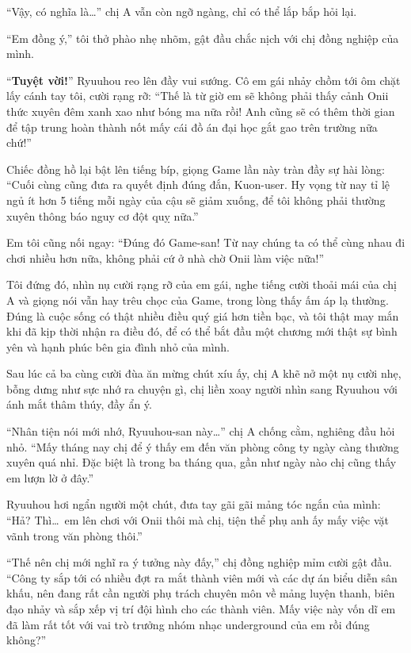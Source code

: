 \documentclass[../main.tex]{subfiles}
\begin{document}
``Vậy, có nghĩa là\dots'' chị A vẫn còn ngỡ ngàng, chỉ có thể lắp bắp hỏi lại.

``Em đồng ý,'' tôi thở phào nhẹ nhõm, gật đầu chắc nịch với chị đồng nghiệp của mình.

``\textbf{Tuyệt vời!}'' Ryuuhou reo lên đầy vui sướng. Cô em gái nhảy chồm tới ôm chặt lấy cánh tay tôi, cười rạng rỡ: ``Thế là từ giờ em sẽ không phải thấy cảnh Onii thức xuyên đêm xanh xao như bóng ma nữa rồi! Anh cũng sẽ có thêm thời gian để tập trung hoàn thành nốt mấy cái đồ án đại học gắt gao trên trường nữa chứ!''

Chiếc đồng hồ lại bật lên tiếng bíp, giọng Game lần này tràn đầy sự hài lòng: ``Cuối cùng cũng đưa ra quyết định đúng đắn, Kuon-user. Hy vọng từ nay tỉ lệ ngủ ít hơn 5 tiếng mỗi ngày của cậu sẽ giảm xuống, để tôi không phải thường xuyên thông báo nguy cơ đột quỵ nữa.''

Em tôi cũng nối ngay: ``Đúng đó Game-san! Từ nay chúng ta có thể cùng nhau đi chơi nhiều hơn nữa, không phải cứ ở nhà chờ Onii làm việc nữa!''

Tôi đứng đó, nhìn nụ cười rạng rỡ của em gái, nghe tiếng cười thoải mái của chị A và giọng nói vẫn hay trêu chọc của Game, trong lòng thấy ấm áp lạ thường. Đúng là cuộc sống có thật nhiều điều quý giá hơn tiền bạc, và tôi thật may mắn khi đã kịp thời nhận ra điều đó, để có thể bắt đầu một chương mới thật sự bình yên và hạnh phúc bên gia đình nhỏ của mình.

\ct

Sau lúc cả ba cùng cười đùa ăn mừng chút xíu ấy, chị A khẽ nở một nụ cười nhẹ, bỗng dưng như sực nhớ ra chuyện gì, chị liền xoay người nhìn sang Ryuuhou với ánh mắt thâm thúy, đầy ẩn ý.

``Nhân tiện nói mới nhớ, Ryuuhou-san này\dots'' chị A chống cằm, nghiêng đầu hỏi nhỏ. ``Mấy tháng nay chị để ý thấy em đến văn phòng công ty ngày càng thường xuyên quá nhỉ. Đặc biệt là trong ba tháng qua, gần như ngày nào chị cũng thấy em lượn lờ ở đây.''

Ryuuhou hơi ngẩn người một chút, đưa tay gãi gãi mảng tóc ngắn của mình: ``Hả? Thì\dots\ em lên chơi với Onii thôi mà chị, tiện thể phụ anh ấy mấy việc vặt vãnh trong văn phòng thôi.''

``Thế nên chị mới nghĩ ra ý tưởng này đấy,'' chị đồng nghiệp mỉm cười gật đầu. ``Công ty sắp tới có nhiều đợt ra mắt thành viên mới và các dự án biểu diễn sân khấu, nên đang rất cần người phụ trách chuyên môn về mảng luyện thanh, biên đạo nhảy và sắp xếp vị trí đội hình cho các thành viên. Mấy việc này vốn dĩ em đã làm rất tốt với vai trò trưởng nhóm nhạc underground của em rồi đúng không?''
\end{document}
